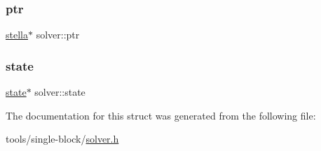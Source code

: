 \mbox{\label{structsolver_a27f2da04c3d4eb24d902d6802b64e0e4}} 
\subsubsection{\texorpdfstring{ptr}{ptr}}
{\footnotesize\ttfamily \mbox{\hyperlink{structstella}{stella}}$\ast$ solver\+::ptr}

\mbox{\label{structsolver_a994899554336bb938b900d9f9f2ea7bb}} 
\subsubsection{\texorpdfstring{state}{state}}
{\footnotesize\ttfamily \mbox{\hyperlink{structstate}{state}}$\ast$ solver\+::state}



The documentation for this struct was generated from the following file\+:\begin{DoxyCompactItemize}
\item 
tools/single-\/block/\mbox{\hyperlink{solver_8h}{solver.\+h}}\end{DoxyCompactItemize}
